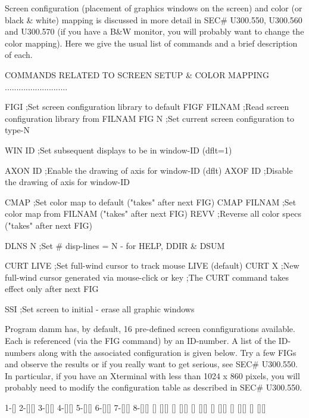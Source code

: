    Screen configuration (placement of graphics  windows  on  the  screen)  and
   color  (or  black  &  white)  mapping  is  discussed in more detail in SEC#
   U300.550, U300.560 and U300.570 (if  you  have  a  B&W  monitor,  you  will
   probably  want to change the color mapping). Here we give the usual list of
   commands and a brief description of each.
 
   COMMANDS RELATED TO SCREEN SETUP & COLOR MAPPING ...........................
 
   FIGI           ;Set  screen configuration library to default
   FIGF FILNAM    ;Read screen configuration library from FILNAM
   FIG  N         ;Set current screen configuration to type-N
 
   WIN  ID        ;Set subsequent displays to be in window-ID (dflt=1)
 
   AXON ID        ;Enable  the drawing of axis for  window-ID (dflt)
   AXOF ID        ;Disable the drawing of axis for  window-ID
 
   CMAP           ;Set color map to default  ("takes" after next FIG)
   CMAP FILNAM    ;Set color map from FILNAM ("takes" after next FIG)
   REVV           ;Reverse all color specs   ("takes" after next FIG)
 
   DLNS N         ;Set # disp-lines = N - for HELP, DDIR & DSUM
 
   CURT LIVE      ;Set full-wind cursor to track mouse LIVE (default)
   CURT X         ;New full-wind cursor generated via mouse-click or key
                  ;The CURT command takes effect only after next FIG
 
   SSI            ;Set screen to initial - erase all graphic windows
 
   Program  damm  has,  by  default,  16  pre-defined  screen  connfigurations
   available.  Each  is  referenced  (via  the FIG command) by an ID-number. A
   list of the ID-numbers along with the  associated  configuration  is  given
   below.  Try a few FIGs and observe the results or if you really want to get
   serious, see SEC# U300.550. In particular, if you have  an  Xterminal  with
   less  than  1024  x  860  pixels,  you  will  probably  need  to modify the
   configuration table as described in SEC# U300.550.
 
    1-[]     2-[][]   3-[][]   4-[][]   5-[][]   6-[][]   7-[][]   8-[][]
                        []       [][]     []       [][]     []       [][]
                                          []       [][]     []       [][]
                                                            []       [][]
 
